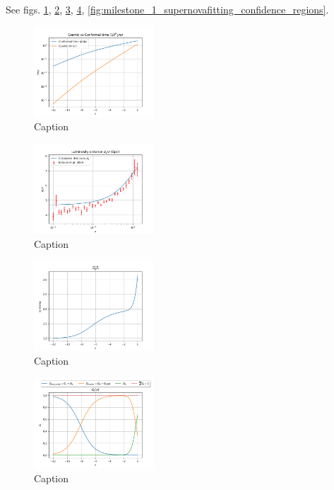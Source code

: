 See figs. \ref{fig:milestone_1_cosmic_vs_conformal_time}, \ref{fig:milestone_1_luminosity_distance}, \ref{fig:milestone_1_etaHp_over_c_of_x}, \ref{fig:milestone_1_Omega_i_of_x}, \ref{fig:milestone_1_supernovafitting_confidence_regions}.

\begin{figure}
\centering
\includegraphics[width=0.4\textwidth]{../Milestone 1/Plots/cosmic_vs_conformal_time.png}
\caption{Caption}
\label{fig:milestone_1_cosmic_vs_conformal_time}
\end{figure}

\begin{figure}
\centering
\includegraphics[width=0.4\textwidth]{../Milestone 1/Plots/luminosity_distance.png}
\caption{Caption}
\label{fig:milestone_1_luminosity_distance}
\end{figure}

\begin{figure}
\centering
\includegraphics[width=0.4\textwidth]{../Milestone 1/Plots/etaHp_over_c_of_x.png}
\caption{Caption}
\label{fig:milestone_1_etaHp_over_c_of_x}
\end{figure}

\begin{figure}
\centering
\includegraphics[width=0.4\textwidth]{../Milestone 1/Plots/Omega_i_of_x.png}
\caption{Caption}
\label{fig:milestone_1_Omega_i_of_x}
\end{figure}

